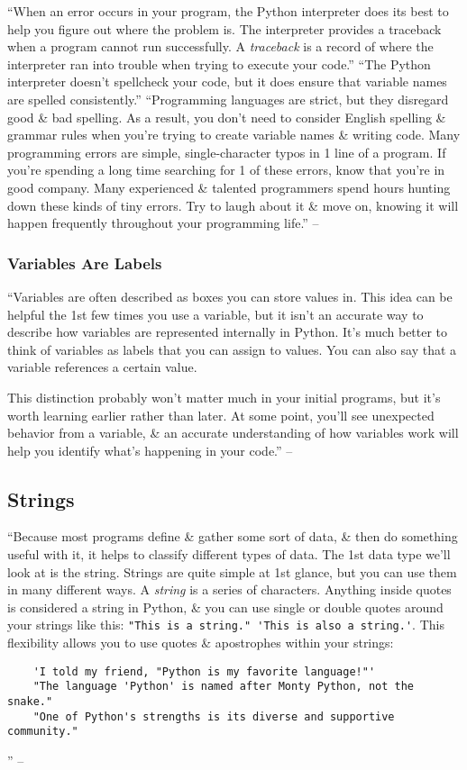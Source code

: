 \documentclass[oneside]{book}
\numberwithin{equation}{section}
\begin{document}
``When an error occurs in your program, the Python interpreter does its best to help you figure out where the problem is. The interpreter provides a traceback when a program cannot run successfully. A \textit{traceback} is a record of where the interpreter ran into trouble when trying to execute your code.'' ``The Python interpreter doesn't spellcheck your code, but it does ensure that variable names are spelled consistently.'' ``Programming languages are strict, but they disregard good \& bad spelling. As a result, you don't need to consider English spelling \& grammar rules when you're trying to create variable names \& writing code. Many programming errors are simple, single-character typos in 1 line of a program. If you're spending a long time searching for 1 of these errors, know that you're in good company. Many experienced \& talented programmers spend hours hunting down these kinds of tiny errors. Try to laugh about it \& move on, knowing it will happen frequently throughout your programming life.'' -- \cite[p. 18]{Matthes2019}

\subsubsection{Variables Are Labels}
``Variables are often described as boxes you can store values in. This idea can be helpful the 1st few times you use a variable, but it isn't an accurate way to describe how variables are represented internally in Python. It's much better to think of variables as labels that you can assign to values. You can also say that a variable references a certain value.

This distinction probably won't matter much in your initial programs, but it's worth learning earlier rather than later. At some point, you'll see unexpected behavior from a variable, \& an accurate understanding of how variables work will help you identify what's happening in your code.'' -- \cite[pp. 18--19]{Matthes2019}

\subsection{Strings}
``Because most programs define \& gather some sort of data, \& then do something useful with it, it helps to classify different types of data. The 1st data type we'll look at is the string. Strings are quite simple at 1st glance, but you can use them in many different ways. A \textit{string} is a series of characters. Anything inside quotes is considered a string in Python, \& you can use single or double quotes around your strings like this: \verb|"This is a string." 'This is also a string.'|. This flexibility allows you to use quotes \& apostrophes within your strings:
\begin{verbatim}
	'I told my friend, "Python is my favorite language!"'
	"The language 'Python' is named after Monty Python, not the snake."
	"One of Python's strengths is its diverse and supportive community."
\end{verbatim}
'' -- \cite[p. 19]{Matthes2019}
\end{document}
